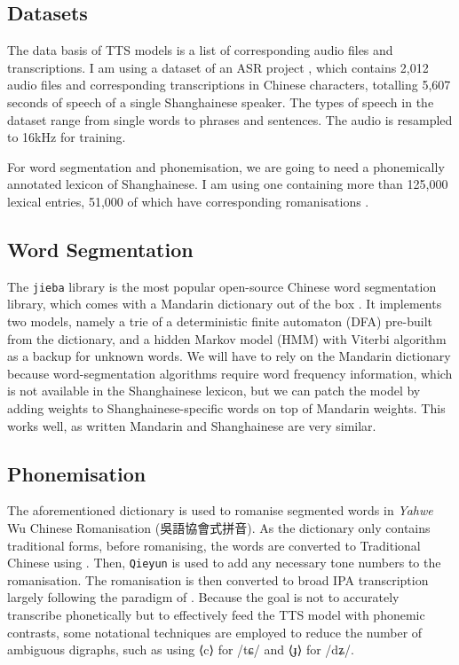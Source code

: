 \documentclass[11pt]{article}
\begin{document}
\subsection{Datasets}
The data basis of TTS models is a list of corresponding audio files and transcriptions.
I am using a dataset of an ASR project \citep{cosmos-breakCosmosBreakAsr2023}, which contains 2,012 audio files and corresponding transcriptions in Chinese characters, totalling 5,607 seconds of speech of a single Shanghainese speaker. The types of speech in the dataset range from single words to phrases and sentences.
The audio is resampled to 16kHz for training.

For word segmentation and phonemisation, we are going to need a phonemically annotated lexicon of Shanghainese. I am using one containing more than 125,000 lexical entries, 51,000 of which have corresponding romanisations \citep{yuanhaochenRimeYahweZaonhe2022}.

\subsection{Word Segmentation}
The \texttt{jieba} library is the most popular open-source Chinese word segmentation library, which comes with a Mandarin dictionary out of the box \citep{junyiJieba2023}.
It implements two models, namely a trie of a deterministic finite automaton (DFA) pre-built from the dictionary, and a hidden Markov model (HMM) with Viterbi algorithm as a backup for unknown words.
We will have to rely on the Mandarin dictionary because word-segmentation algorithms require word frequency information, which is not available in the Shanghainese lexicon, but we can patch the model by adding weights to Shanghainese-specific words on top of Mandarin weights. This works well, as written Mandarin and Shanghainese are very similar.

\subsection{Phonemisation}
The aforementioned dictionary \citep{yuanhaochenRimeYahweZaonhe2022} is used to romanise segmented words in \emph{Yahwe} Wu Chinese Romanisation (吳語協會式拼音).
As the dictionary only contains traditional forms, before romanising, the words are converted to Traditional Chinese using \citet{kuoOpenChineseConvert2023}.
Then, \texttt{Qieyun} \citep{Qieyunpython2022} is used to add any necessary tone numbers to the romanisation.
The romanisation is then converted to broad IPA transcription largely following the paradigm of \citet{qianShanghaiFangYan2007}. Because the goal is not to accurately transcribe phonetically but to effectively feed the TTS model with phonemic contrasts, some notational techniques are employed to reduce the number of ambiguous digraphs, such as using ⟨c⟩ for /tɕ/ and ⟨ɟ⟩ for /dʑ/.
\end{document}
